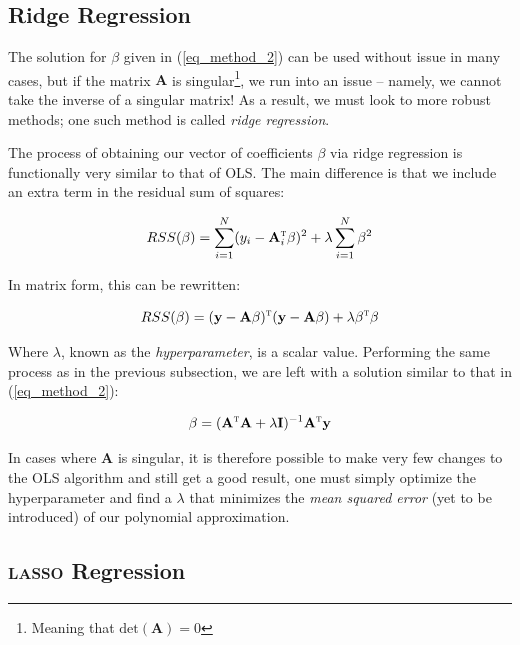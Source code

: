 \documentclass[a4paper,10pt,english]{article}
\begin{document}
\subsection*{Ridge Regression}

The solution for $\beta$ given in (\ref{eq_method_2}) can be used without issue in many cases, but if the matrix $\mathbf{A}$ is singular\footnote{Meaning that $\text{det}(\mathbf{A}) = 0$}, we run into an issue – namely, we cannot take the inverse of a singular matrix!  As a result, we must look to more robust methods; one such method is called \textit{ridge regression}.  

The process of obtaining our vector of coefficients $\beta$ via ridge regression is functionally very similar to that of OLS.  The main difference is that we include an extra term in the residual sum of squares:

\begin{equation*}
RSS(\beta) = \sum_{i=1}^N (y_i - \mathbf{A}_i^\textsc{t} \beta)^2 + \lambda \sum_{i=1}^N \beta^2
\end{equation*}

In matrix form, this can be rewritten:	

\begin{equation*}
RSS(\beta) = (\mathbf{y} - \mathbf{A} \beta)^\textsc{t}(\mathbf{y} - \mathbf{A} \beta) + \lambda \beta^\textsc{t} \beta
\end{equation*}

Where $\lambda$, known as the \textit{hyperparameter}, is a scalar value. Performing the same process as in the previous subsection, we are left with a solution similar to that in (\ref{eq_method_2}):

\begin{equation}
\label{eq_method_3}
\beta = (\mathbf{A}^\textsc{t} \mathbf{A} + \lambda \mathbf{I}) ^{-1} \mathbf{A}^\textsc{t} \mathbf{y}
\end{equation}

In cases where $\mathbf{A}$ is singular, it is therefore possible to make very few changes to the OLS algorithm and still get a good result, one must simply optimize the hyperparameter and find a $\lambda$ that minimizes the \textit{mean squared error} (yet to be introduced) of our polynomial approximation.

\subsection*{\textsc{lasso} Regression}
\end{document}
